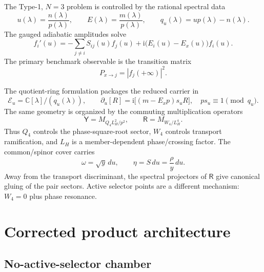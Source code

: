 \documentclass[11pt]{article}
\newcommand{\C}{\mathbb C}
\newcommand{\ii}{\mathrm i}
\newcommand{\calE}{\mathcal E}
\newcommand{\Yop}{\mathsf Y}
\newcommand{\Rop}{\mathsf R}
\begin{document}
The Type-1, $N=3$ problem is controlled by the rational spectral data
\begin{equation}
 u(\lambda)=\frac{n(\lambda)}{p(\lambda)},\qquad E(\lambda)=\frac{m(\lambda)}{p(\lambda)},\qquad q_u(\lambda)=u p(\lambda)-n(\lambda).
\end{equation}
The gauged adiabatic amplitudes solve
\begin{equation}
\label{eq:gauged-ode}
f_i'(u)=-\sum_{j\neq i}S_{ij}(u)f_j(u)+\ii\bigl(E_i(u)-E_x(u)\bigr)f_i(u).
\end{equation}
The primary benchmark observable is the transition matrix
\begin{equation}
P_{x\to j}=|f_j(+\infty)|^2.
\end{equation}

The quotient-ring formulation packages the reduced carrier in
\begin{equation}
 \calE_u=\C[\lambda]/(q_u(\lambda)),\qquad \partial_u[R]=\ii\big[(m-E_xp)s_uR\big],\quad ps_u\equiv 1 \pmod{q_u}.
\end{equation}
The same geometry is organized by the commuting multiplication operators
\begin{equation}
\Yop=M_{Q_4L_H^2/p^2},\qquad \Rop=M_{W_4/L_H^4}.
\end{equation}
Thus $Q_4$ controls the phase-square-root sector, $W_4$ controls transport ramification, and $L_H$ is a member-dependent phase/crossing factor. The common/spinor cover carries
\begin{equation}
\omega=\sqrt{y}\,du,
\qquad
\eta=S\,du=\frac{\rho}{y}\,du.
\end{equation}
Away from the transport discriminant, the spectral projectors of $\Rop$ give canonical gluing of the pair sectors. Active selector points are a different mechanism: $W_4=0$ plus phase resonance.

\section{Corrected product architecture}

\subsection{No-active-selector chamber}
\end{document}
